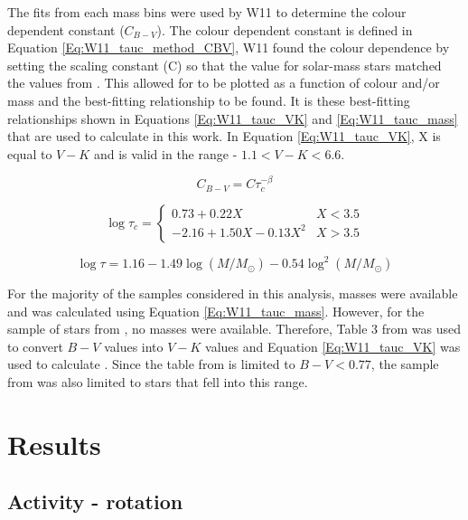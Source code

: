 The fits from each mass bins were used by W11 to determine the colour dependent constant ($C_{B-V}$). The colour dependent constant is defined in Equation \ref{Eq:W11_tauc_method_CBV}, W11 found the colour dependence by setting the scaling constant (C) so that the \tauc value for solar-mass stars matched the values from \citet{Noyes_etal_1984}. This allowed for \tauc to be plotted as a function of colour and/or mass and the best-fitting relationship to be found. It is these best-fitting relationships shown in Equations \ref{Eq:W11_tauc_VK} and \ref{Eq:W11_tauc_mass} that are used to calculate \tauc in this work. In Equation \ref{Eq:W11_tauc_VK}, X is equal to $V-K$ and is valid in the range - $1.1 < V-K < 6.6$.

\begin{equation}
    C_{B-V} = C\tau_{c}^{-\beta}
    \label{Eq:W11_tauc_method_CBV}
\end{equation}

\begin{equation}
    \log \tau_{c} = 
    \begin{cases}
        0.73 + 0.22X & X < 3.5 \\
        -2.16 +1.50X - 0.13X^{2} & X > 3.5
    \end{cases}
    \label{Eq:W11_tauc_VK}
\end{equation}

\begin{equation}
    \log \tau = 1.16 - 1.49\log(M/M_{\odot}) - 0.54\log^{2}(M/M_{\odot})
    \label{Eq:W11_tauc_mass}
\end{equation}

For the majority of the samples considered in this analysis, masses were available and \tauc was calculated using Equation \ref{Eq:W11_tauc_mass}. However, for the sample of stars from \citet{Baliunas_etal_1996}, no masses were available. Therefore, Table 3 from \citet{Pecaut_etal_2012} was used to convert $B-V$ values into $V-K$ values and Equation \ref{Eq:W11_tauc_VK} was used to calculate \tauc. Since the table from \citet{Pecaut_etal_2012} is limited to $B-V < 0.77$, the sample from \citet{Baliunas_etal_1996} was also limited to stars that fell into this range.

\section{Results}

\subsection{Activity - rotation}
\label{Chp5_results_activity_rotation}

